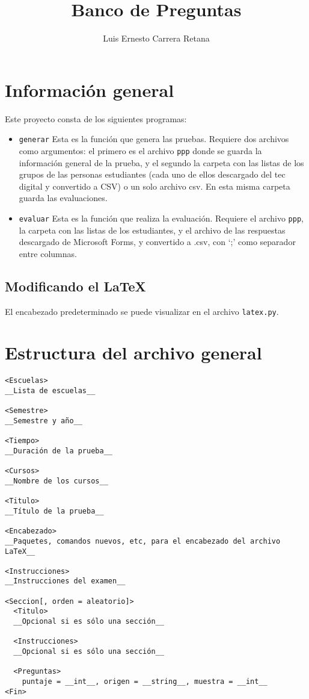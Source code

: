 \documentclass[12pt]{article}
\title{Banco de Preguntas}
\author{Luis Ernesto Carrera Retana}
\theoremstyle{definition}
\begin{document}
\maketitle

\section{Información general}

Este proyecto consta de los siguientes programas:
\begin{itemize}
  \item \verb|generar| Esta es la función que genera las pruebas. Requiere dos archivos como argumentos: el primero es el archivo \verb|ppp| donde se guarda la información general de la prueba, y el segundo la carpeta con las listas de los grupos de las personas estudiantes (cada uno de ellos descargado del tec digital y convertido a CSV) o un solo archivo csv. En esta misma carpeta guarda las evaluaciones.

  \item \verb|evaluar| Esta es la función que realiza la evaluación. Requiere el archivo \verb|ppp|, la carpeta con las listas de los estudiantes, y el archivo de las respuestas descargado de Microsoft Forms, y convertido a .csv, con `;' como separador entre columnas.
\end{itemize}

\subsection{Modificando el \LaTeX}
El encabezado predeterminado se puede visualizar en el archivo \verb|latex.py|.

\section{Estructura del archivo general}
\begin{verbatim}
<Escuelas>
__Lista de escuelas__

<Semestre>
__Semestre y año__

<Tiempo>
__Duración de la prueba__

<Cursos>
__Nombre de los cursos__

<Titulo>
__Título de la prueba__

<Encabezado>
__Paquetes, comandos nuevos, etc, para el encabezado del archivo LaTeX__

<Instrucciones>
__Instrucciones del examen__

<Seccion[, orden = aleatorio]>
  <Titulo>
  __Opcional si es sólo una sección__

  <Instrucciones>
  __Opcional si es sólo una sección__

  <Preguntas>
    puntaje = __int__, origen = __string__, muestra = __int__
<Fin>
\end{verbatim}
\end{document}
